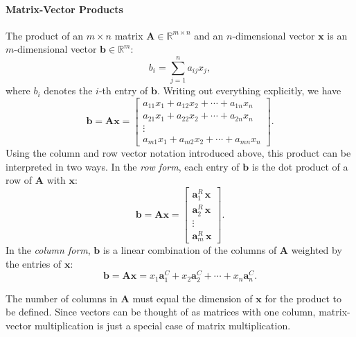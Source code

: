 \paragraph*{Matrix-Vector Products}
The product of an $m\times n$ matrix $ \mathbf{A} \in\mathbb{R}^{m\times n}$ and an $n$-dimensional vector $ \mathbf{x} $ is an $m$-dimensional vector $\mathbf{b}\in \mathbb{R}^m $:
\begin{equation*}
  b_i = \sum_{j=1}^n a_{ij} x_j,
\end{equation*}
where $b_i$ denotes the $i$-th entry of $\mathbf{b}$.
Writing out everything explicitly, we have
\begin{equation*}
  \mathbf{b} = \mathbf{A}\mathbf{x} = \begin{bmatrix}
    a_{11}x_1 + a_{12}x_2 + \cdots + a_{1n}x_n \\
    a_{21}x_1 + a_{22}x_2 + \cdots + a_{2n}x_n \\
    \vdots \\
    a_{m1}x_1 + a_{m2}x_2 + \cdots + a_{mn}x_n
  \end{bmatrix}.
\end{equation*}
Using the column and row vector notation introduced above, this product can be interpreted in two ways.
In the \emph{row form}, each entry of $ \mathbf{b} $ is the dot product of a row of $ \mathbf{A} $ with $ \mathbf{x} $:
\begin{equation*}
  \mathbf{b} = \mathbf{A}\mathbf{x}
  = \begin{bmatrix} \mathbf{a}^R_1\, \mathbf{x} \\ \mathbf{a}^R_2\, \mathbf{x} \\ \vdots \\ \mathbf{a}^R_m\, \mathbf{x} \end{bmatrix}.
\end{equation*}
In the \emph{column form}, $ \mathbf{b} $ is a linear combination of the columns of $ \mathbf{A} $ weighted by the entries of $ \mathbf{x} $:
\begin{equation*}
  \mathbf{b} = \mathbf{A}\mathbf{x}
  = x_1 \mathbf{a}^C_1 + x_2 \mathbf{a}^C_2 + \cdots + x_n \mathbf{a}^C_n.
\end{equation*}

The number of columns in $ \mathbf{A} $ must equal the dimension of $ \mathbf{x} $ for the product to be defined. Since vectors can be thought of as matrices with one column, matrix-vector multiplication is just a special case of matrix multiplication.

